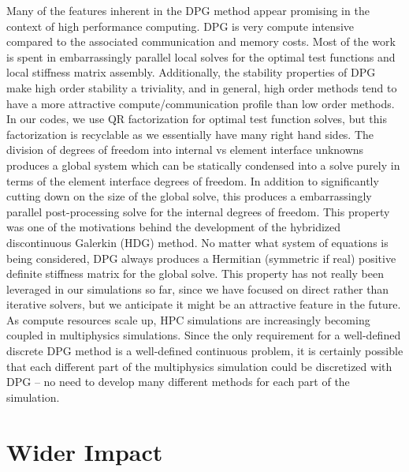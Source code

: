 \documentclass[letterpaper,12pt]{article}
\begin{document}
Many of the features inherent in the DPG method appear promising in the context of high performance computing.
DPG is very compute intensive compared to the associated communication and memory costs.
Most of the work is spent in embarrassingly parallel local solves for the optimal test functions and local stiffness matrix assembly.
Additionally, the stability properties of DPG make high order stability a triviality, and in general, 
high order methods tend to have a more attractive compute/communication profile than low order methods.
In our codes, we use QR factorization for optimal test function solves, but this factorization is recyclable as we essentially have many right hand sides.
The division of degrees of freedom into internal vs element interface unknowns produces a global system which can be statically condensed into 
a solve purely in terms of the element interface degrees of freedom.
In addition to significantly cutting down on the size of the global solve, 
this produces a embarrassingly parallel post-processing solve for the internal degrees of freedom.
This property was one of the motivations behind the development of the hybridized discontinuous Galerkin (HDG) \cite{HDG} method.
No matter what system of equations is being considered, DPG always produces a Hermitian (symmetric if real) 
positive definite stiffness matrix for the global solve.
This property has not really been leveraged in our simulations so far, since we have focused on direct rather than iterative solvers, but we
anticipate it might be an attractive feature in the future.
As compute resources scale up, HPC simulations are increasingly becoming coupled in multiphysics simulations.
Since the only requirement for a well-defined discrete DPG method is a well-defined continuous problem, 
it is certainly possible that each different part of the multiphysics simulation could be discretized with DPG -- 
no need to develop many different methods for each part of the simulation.

\section*{Wider Impact}
\end{document}
